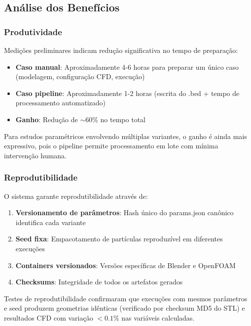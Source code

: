 \subsection{Análise dos Benefícios}

\subsubsection{Produtividade}

Medições preliminares indicam redução significativa no tempo de preparação:

\begin{itemize}
    \item \textbf{Caso manual}: Aproximadamente 4-6 horas para preparar um único caso (modelagem, configuração CFD, execução)
    \item \textbf{Caso pipeline}: Aproximadamente 1-2 horas (escrita do .bed + tempo de processamento automatizado)
    \item \textbf{Ganho}: Redução de $\sim$60\% no tempo total
\end{itemize}

Para estudos paramétricos envolvendo múltiplas variantes, o ganho é ainda mais expressivo, pois o pipeline permite processamento em lote com mínima intervenção humana.

\subsubsection{Reprodutibilidade}

O sistema garante reprodutibilidade através de:

\begin{enumerate}
    \item \textbf{Versionamento de parâmetros}: Hash único do params.json canônico identifica cada variante
    \item \textbf{Seed fixa}: Empacotamento de partículas reproduzível em diferentes execuções
    \item \textbf{Containers versionados}: Versões específicas de Blender e OpenFOAM
    \item \textbf{Checksums}: Integridade de todos os artefatos gerados
\end{enumerate}

Testes de reprodutibilidade confirmaram que execuções com mesmos parâmetros e seed produzem geometrias idênticas (verificado por checksum MD5 do STL) e resultados CFD com variação $< 0.1\%$ nas variáveis calculadas.

